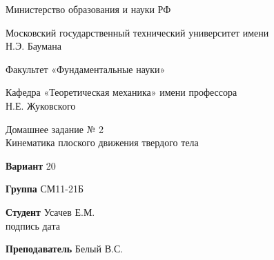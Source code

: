 \documentclass{article}
\begin{document}




\thispagestyle{empty}

\begingroup
\setlength{\parindent}{0pt}

\begin{bfseries}

\vspace*{0cm}
Министерство образования и науки РФ

\vspace{2cm}
Московский государственный технический университет имени\\Н.Э. Баумана

\vspace{2cm}
Факультет «Фундаментальные науки»

\vspace{2cm}
Кафедра «Теоретическая механика» имени профессора\\ Н.Е. Жуковского

\vspace{2cm}

Домашнее задание № 2\\
Кинематика плоского движения твердого тела

\end{bfseries}

\vspace{2cm}

\textbf{Вариант} \hspace{0.5cm} 20

\vspace{0.5cm}

\textbf{Группа} \hspace{0.5cm} СМ11-21Б

\vspace{0.5cm}

\textbf{Студент} \hspace{0.5cm} Усачев Е.М. \hspace{1.5cm} \underline{\hspace{3cm}} 
\hspace{1cm}\underline{\hspace{3cm}}\\
\small\hspace*{8.5cm} подпись \hspace{2.7 cm} дата \normalsize

\vspace{0cm}
\textbf{Преподаватель} \hspace{0.5cm} Белый В.С.
\end{document}
